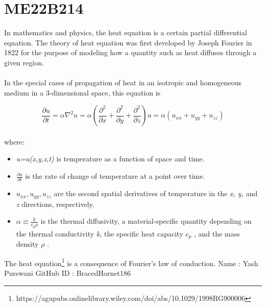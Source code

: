 \section{ME22B214}

In mathematics and physics, the heat equation is a certain partial differential equation. The theory of heat equation was first developed by Joseph Fourier in 1822 for the purpose of modeling how a quantity such as heat diffuses through a given region.
\\ \\
In the special cases of propagation of heat in an isotropic and homogeneous medium in a 3-dimensional space, this equation is

\begin{equation}
    \frac{\partial u}{\partial t} = \alpha\nabla^2u = \alpha \left(\frac{\partial^2}{\partial x}+\frac{\partial^2}{\partial y}+\frac{\partial^2}{\partial z}\right)u = \alpha(u_{xx}+u_{yy}+u_{zz})
    \label {eqn:heat}
\end{equation}
\\
where:
\begin{itemize}
    \item \emph{u=u(x,y,z,t)} is temperature as a function of space and time. 
    \item $\frac{\partial u}{\partial t}$ is the rate of change of temperature at a point over time.
    \item $u_{xx},u_{yy},u_{zz}$ are the second spatial derivatives of temperature in the \emph{x, y,} and \emph{z} directions, respectively.
    \item $\alpha \equiv \frac{k}{c_p\rho}$ is the thermal diffusivity, a material-specific quantity depending on the thermal conductivity \emph{k}, the specific heat capacity $c_p$ , and the mass density $\rho$ .
\end{itemize}\leavevmode
The heat equation\footnote{https://agupubs.onlinelibrary.wiley.com/doi/abs/10.1029/1998RG900006} is a consequence of Fourier's law of conduction.
Name : Yash Purswani
GitHub ID : BracedHornet186
